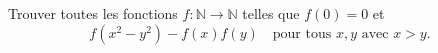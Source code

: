 \documentclass[varwidth]{standalone}
\begin{document}
    Trouver toutes les fonctions $f: \mathbb{N} \to \mathbb{N}$ telles que $f(0) = 0$ et
    \[
        f\left( x^2 - y^2 \right) - f(x) f(y) \quad \text{pour tous } x, y \text{ avec } x > y.  
    \]
\end{document}
